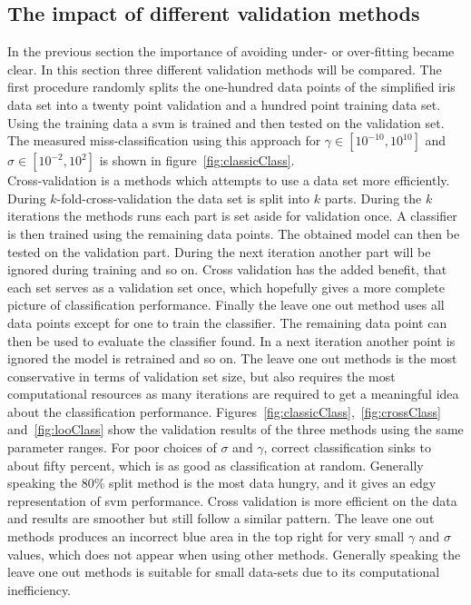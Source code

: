 \subsection{The impact of different validation methods}
In the previous section the importance of avoiding under- or over-fitting became clear. In this section three different validation methods will be compared. The first procedure randomly splits the one-hundred data points of the simplified iris data set into a twenty point validation and a hundred point training data set. Using the training data a svm is trained and then tested on the validation set. The measured miss-classification using this approach for $\gamma \in [10^{-10},10^{10}]$ and $\sigma \in [10^{-2},10^{2}]$ is shown in figure~\ref{fig:classicClass}. \\
Cross-validation is a methods which attempts to use a data set more efficiently. During $k$-fold-cross-validation the data set is split into $k$ parts. During the $k$ iterations the methods runs each part is set aside for validation once. A classifier is then trained using the remaining data points. The obtained model can then be tested on the validation part. During the next iteration another part will be ignored during training and so on. Cross validation has the added benefit, that each set serves as a validation set once, which hopefully gives a more complete picture of classification performance. 
Finally the leave one out method uses all data points except for one to train the classifier. The remaining data point can then be used to evaluate the classifier found. In a next iteration another point is ignored the model is retrained and so on. The leave one out methods is the most conservative in terms of validation set size, but also requires the most computational resources as many iterations are required to get a meaningful idea about the classification performance. 
Figures~\ref{fig:classicClass},~\ref{fig:crossClass} and~\ref{fig:looClass} show the validation results of the three methods using the same parameter ranges. For poor choices of $\sigma$ and $\gamma$, correct classification sinks to about fifty percent, which is as good as classification at random. Generally speaking the 80\% split method is the most data hungry, and it gives an edgy representation of svm performance. Cross validation is more efficient on the data and results are smoother but still follow a similar pattern. The leave one out methods produces an incorrect blue area in the top right for very small $\gamma$ and $\sigma$ values, which does not appear when using other methods. Generally speaking the leave one out methods is suitable for small data-sets due to its computational inefficiency. 


